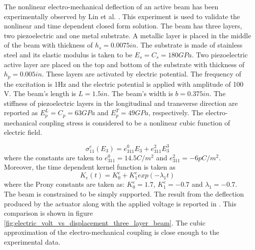 The nonlinear electro-mechanical deflection of an active beam has been experimentally observed by Lin et al. \cite{Li2004959}.
This experiment is used to validate the nonlinear and time dependent closed form solution.
The beam has three layers, two piezoelectric and one metal substrate.
A metallic layer is placed in the middle of the beam with thickness of $h_s=0.0075in$. %
The substrate is made of stainless steel and its elastic modulus is taken to be $E_s=C_s=180 GPa$.
Two piezoelectric active layer are placed on the top and bottom of the substrate with thickness of $h_p=0.005in$. %
These layers are activated by electric potential.
The frequency of the excitation is 1Hz and the electric potential is applied with amplitude of 100 V.
The beam's length is $L=1.5 in$. %
The beam's width is $b=0.375 in$. %
The stiffness of piezoelectric layers in the longitudinal and transverse direction are reported as $E^L_p=C_p=63 GPa$ and $E^T_p=49 GPa$, respectively.
The electro-mechanical coupling stress is considered to be a nonlinear cubic function of electric field.

\begin{equation}
\sigma^e_{11}(E_3)= e^0_{311}E_3+e^2_{311}E^3_3
\label{EQN:cubic_coupling_stress_three_layer_beam}
\end{equation}
where the constants are taken to $e^0_{311}=14.5 C/m^2$ and $e^2_{311}=-6 pC/m^2$.
Moreover, the time dependent kernel function is taken as
\begin{equation}
K_e(t)=K^e_0+K^e_1exp(-\lambda_1 t )
\label{EQN:time_dependent_kernel}
\end{equation}
where the Prony constants are taken as: $K^e_0=1.7$, $K^e_1=-0.7$ and $\lambda_1=-0.7$.
The beam is constrained to be simply supported.
The result from the deflection produced by the actuator along with the applied voltage is reported in \cite{Li2004959}.
This comparison is shown in figure \ref{fig:electric_volt_vs_displacement_three_layer_beam}.
The cubic approximation of the electro-mechanical coupling is close enough to the experimental data.
\\

